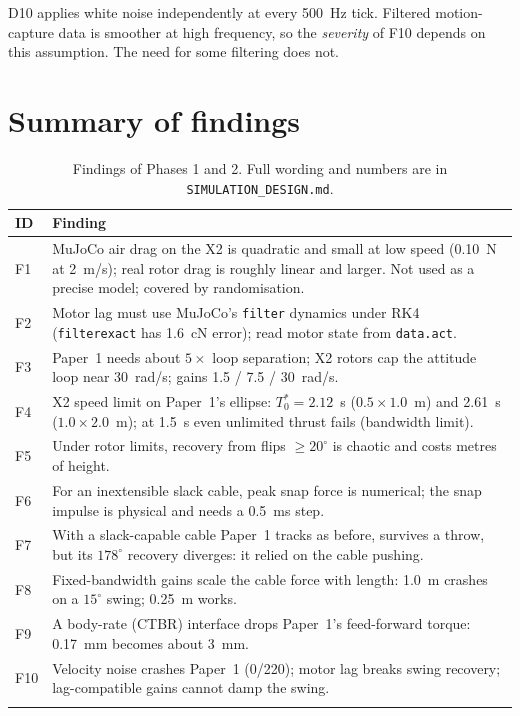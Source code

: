 \documentclass[11pt,a4paper]{article}
\newcommand{\code}[1]{\texttt{\small #1}}
\begin{document}
\begin{cavbox}[title={Caveat on the noise model}]
D10 applies white noise independently at every 500~Hz tick. Filtered motion-capture data is smoother at high frequency,
so the \emph{severity} of F10 depends on this assumption. The need for some filtering does not.
\end{cavbox}

\section{Summary of findings}

\begin{longtable}{@{}p{}p{}@{}}
\toprule
ID & Finding \\
\midrule
\endhead
F1 & MuJoCo air drag on the X2 is quadratic and small at low speed (0.10~N at 2~m/s); real rotor drag is roughly linear and
larger. Not used as a precise model; covered by randomisation. \\
F2 & Motor lag must use MuJoCo's \code{filter} dynamics under RK4 (\code{filterexact} has 1.6~cN error); read motor state
from \code{data.act}. \\
F3 & Paper~1 needs about $5\times$ loop separation; X2 rotors cap the attitude loop near 30~rad/s; gains 1.5 / 7.5 /
30~rad/s. \\
F4 & X2 speed limit on Paper~1's ellipse: $T_0^\ast = 2.12$~s ($0.5\times1.0$~m) and 2.61~s ($1.0\times2.0$~m); at
1.5~s even unlimited thrust fails (bandwidth limit). \\
F5 & Under rotor limits, recovery from flips $\ge 20^\circ$ is chaotic and costs metres of height. \\
F6 & For an inextensible slack cable, peak snap force is numerical; the snap impulse is physical and needs a 0.5~ms step. \\
F7 & With a slack-capable cable Paper~1 tracks as before, survives a throw, but its $178^\circ$ recovery diverges: it relied
on the cable pushing. \\
F8 & Fixed-bandwidth gains scale the cable force with length: 1.0~m crashes on a $15^\circ$ swing; 0.25~m works. \\
F9 & A body-rate (CTBR) interface drops Paper~1's feed-forward torque: 0.17~mm becomes about 3~mm. \\
F10 & Velocity noise crashes Paper~1 (0/220); motor lag breaks swing recovery; lag-compatible gains cannot damp the swing. \\
\bottomrule
\caption{Findings of Phases 1 and 2. Full wording and numbers are in \code{SIMULATION\_DESIGN.md}.}
\end{longtable}
\end{document}
